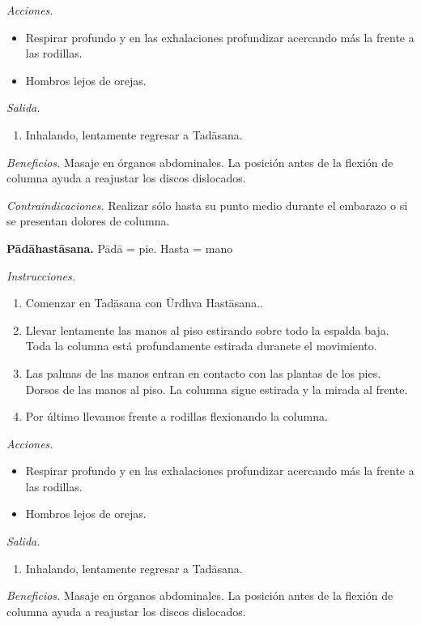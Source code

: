 \emph{Acciones.}
\begin{itemize}
\item Respirar profundo y en las exhalaciones
profundizar acercando más la frente a las
rodillas.
\item Hombros lejos de orejas.
\end{itemize}

\emph{Salida.}
\begin{enumerate}
\item Inhalando, lentamente regresar a
Tadāsana.
\end{enumerate}

\emph{Beneficios.} Masaje en órganos
abdominales. La posición antes de la flexión
de columna ayuda a reajustar los discos
dislocados.

\emph{Contraindicaciones.} Realizar sólo
hasta su punto medio durante el embarazo o si
se presentan dolores de columna.

\medskip\noindent\textbf{Pādāhastāsana.}
Pādā = pie. Hasta = mano

\emph{Instrucciones.}
\begin{enumerate}
\item Comenzar en Tadāsana con Ūrdhva
Hastāsana..
\item Llevar lentamente las manos al piso
estirando sobre todo la espalda baja. Toda la
columna está profundamente estirada duranete
el movimiento.
\item Las palmas de las manos entran en
contacto con las plantas de los pies. Dorsos
de las manos al piso. La columna sigue
estirada y la mirada al frente.
\item Por último llevamos frente a rodillas
flexionando la columna.
\end{enumerate}

\emph{Acciones.}
\begin{itemize}
\item Respirar profundo y en las exhalaciones
profundizar acercando más la frente a las
rodillas.
\item Hombros lejos de orejas.
\end{itemize}

\emph{Salida.}
\begin{enumerate}
\item Inhalando, lentamente regresar a
Tadāsana.
\end{enumerate}

\emph{Beneficios.} Masaje en órganos
abdominales. La posición antes de la flexión
de columna ayuda a reajustar los discos
dislocados.

